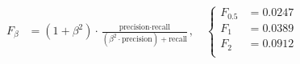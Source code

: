 \begin{align*}
    F_\beta &= (1+\beta^2) \cdot \frac{\text{precision} \cdot \text{recall}}{(\beta^2\cdot\text{precision}) + \text{recall}},\quad
    \begin{cases} 
    F_{0.5} &= 0.0247\\ 
    F_1     &= 0.0389\\ 
    F_2     &= 0.0912\\ 
    \end{cases}
\end{align*}